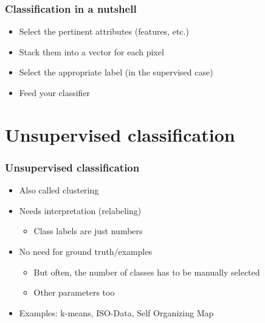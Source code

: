 \documentclass[compress]{beamer}
\begin{document}
\begin{frame}
  \frametitle{Classification in a nutshell}
  \begin{itemize}
  \item Select the pertinent attributes (features, etc.)
  \item Stack them into a vector for each pixel
  \item Select the appropriate label (in the supervised case)
  \item Feed your classifier
  \end{itemize}
\end{frame}
\section[Unsupervised]{Unsupervised classification}
\label{sec:unsupervised}
\begin{frame}
\frametitle{Unsupervised classification}
  \begin{itemize}
  \item Also called clustering
  \item Needs interpretation (relabeling)
    \begin{itemize}
    \item Class labels are just numbers
    \end{itemize}
  \item No need for ground truth/examples
    \begin{itemize}
    \item But often, the number of classes has to be manually selected
    \item Other parameters too
    \end{itemize}
  \item Examples: k-means, ISO-Data, Self Organizing Map
  \end{itemize}
\end{frame}
\end{document}
